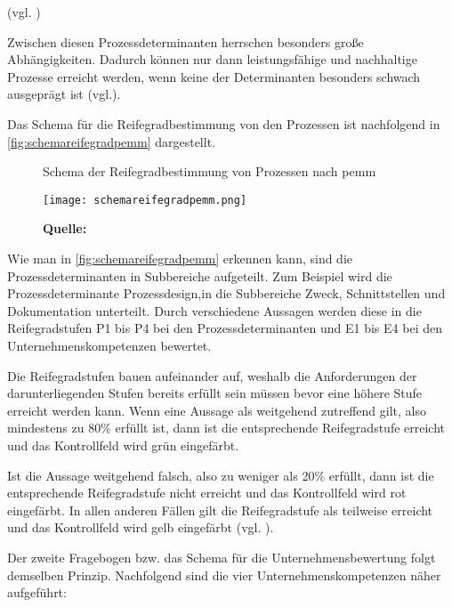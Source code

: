(vgl. \cite[S.41]{Bensiek2013})

Zwischen diesen Prozessdeterminanten herrschen besonders große Abhängigkeiten. Dadurch können nur dann leistungsfähige und nachhaltige Prozesse erreicht werden, wenn keine der Determinanten besonders schwach ausgeprägt ist (vgl.\cite[S.41]{Bensiek2013}).\par

Das Schema für die Reifegradbestimmung von den Prozessen ist nachfolgend in \autoref{fig:schemareifegradpemm} dargestellt.

\begin{figure}[H]
  \centering
  \caption{Schema der Reifegradbestimmung von Prozessen nach \acs{pemm}}
  \texttt{[image: schemareifegradpemm.png]}
  \caption*{\footnotesize{\textbf{Quelle:} \cite[S.83]{Carlo2014}}}
  \label{fig:schemareifegradpemm}
\end{figure}

Wie man in \autoref{fig:schemareifegradpemm} erkennen kann, sind die Prozessdeterminanten in Subbereiche aufgeteilt. Zum Beispiel wird die Prozessdeterminante Prozessdesign,in die Subbereiche Zweck, Schnittstellen und Dokumentation unterteilt. Durch verschiedene Aussagen werden diese in die Reifegradstufen P1 bis P4 bei den Prozessdeterminanten und E1 bis E4 bei den Unternehmenskompetenzen bewertet.\par
Die Reifegradstufen bauen aufeinander auf, weshalb die Anforderungen der darunterliegenden Stufen bereits erfüllt sein müssen bevor eine höhere Stufe erreicht werden kann. Wenn eine Aussage als weitgehend zutreffend gilt, also mindestens zu 80\% erfüllt ist, dann ist die entsprechende Reifegradstufe erreicht und das Kontrollfeld wird grün eingefärbt.\par
Ist die Aussage weitgehend falsch, also zu weniger als 20\% erfüllt, dann ist die entsprechende Reifegradstufe nicht erreicht und das Kontrollfeld wird rot eingefärbt. In allen anderen Fällen gilt die Reifegradstufe als teilweise erreicht und das Kontrollfeld wird gelb eingefärbt (vgl. \cite[S.83]{Carlo2014}). \par

Der zweite Fragebogen bzw. das Schema für die Unternehmensbewertung folgt demselben Prinzip. Nachfolgend sind die vier Unternehmenskompetenzen näher aufgeführt:

